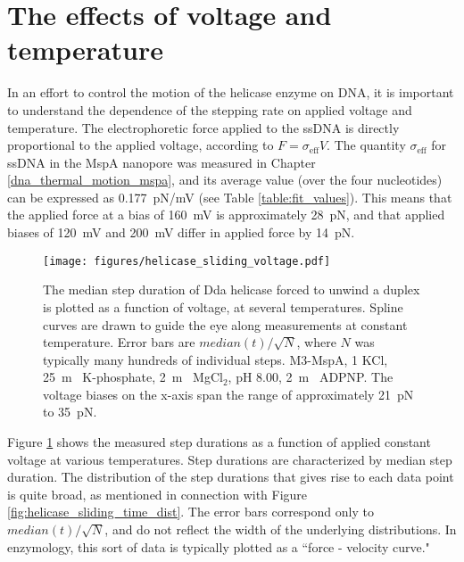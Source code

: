 \section{The effects of voltage and temperature}

In an effort to control the motion of the helicase enzyme on DNA, it is important to understand the dependence of the stepping rate on applied voltage and temperature.  The electrophoretic force applied to the ssDNA is directly proportional to the applied voltage, according to $F = \sigma_{\text{eff}} V$.  The quantity $\sigma_{\text{eff}}$ for ssDNA in the MspA nanopore was measured in Chapter \ref{dna_thermal_motion_mspa}, and its average value (over the four nucleotides) can be expressed as \SI{0.177}{\pico\N / \mV} (see Table \ref{table:fit_values}).  This means that the applied force at a bias of \SI{160}{\mV} is approximately \SI{28}{\pico\N}, and that applied biases of \SI{120}{\mV} and \SI{200}{\mV} differ in applied force by \SI{14}{\pico\N}.

\begin{figure}[h]
\begin{centering}
\texttt{[image: figures/helicase\_sliding\_voltage.pdf]}
\caption[Forced helicase stepping depends on voltage]{The median step duration of Dda helicase forced to unwind a duplex is plotted as a function of voltage, at several temperatures.  Spline curves are drawn to guide the eye along measurements at constant temperature.  Error bars are $median(t)/\sqrt{N}$, where $N$ was typically many hundreds of individual steps.  M3-MspA, \SI{1}{\Molar} KCl, \SI{25}{\m\Molar} K-phosphate, \SI{2}{\m\Molar} MgCl$_2$, pH \num{8.00}, \SI{2}{\m\Molar} ADPNP.  The voltage biases on the x-axis span the range of approximately \SI{21}{\pico\N} to \SI{35}{\pico\N}.}
\label{fig:helicase_stepping_voltage}
\end{centering}
\end{figure}

Figure \ref{fig:helicase_stepping_voltage} shows the measured step durations as a function of applied constant voltage at various temperatures.  Step durations are characterized by median step duration.  The distribution of the step durations that gives rise to each data point is quite broad, as mentioned in connection with Figure \ref{fig:helicase_sliding_time_dist}.  The error bars correspond only to $median(t)/\sqrt{N}$, and do not reflect the width of the underlying distributions.  In enzymology, this sort of data is typically plotted as a ``force - velocity curve."

